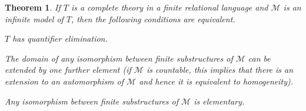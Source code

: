 \documentclass[10pt]{amsart}
\newcommand{\MM}{\mathcal{M}}
\newtheorem{theorem}{Theorem}[subsection]
\theoremstyle{definition}
\theoremstyle{remark}
\newenvironment{enumerate-(a)}{\begin{enumerate}[label={\upshape (\alph*)}, leftmargin=2pc]}{\end{enumerate}}
\begin{document}
\begin{theorem} \label{quantifier elimination for relational structures}
If $T$ is a complete theory in a finite relational language and $\MM$ is an infinite model of $T$, then the following conditions are equivalent. 
\begin{enumerate-(a)} 
\item \label{quantifier elimination for relational structures 1}
$T$ has quantifier elimination. 
\item \label{quantifier elimination for relational structures 2}
The domain of any isomorphism between finite substructures of $\MM$ can be extended by one further element (if $\MM$ is countable, this implies that there is an extension to an automorphism of $\MM$ and hence it is equivalent to homogeneity). 
\item \label{quantifier elimination for relational structures 3}
Any isomorphism between finite substructures of $\MM$ is elementary. 
\end{enumerate-(a)} 
\end{theorem} 
\end{document}
